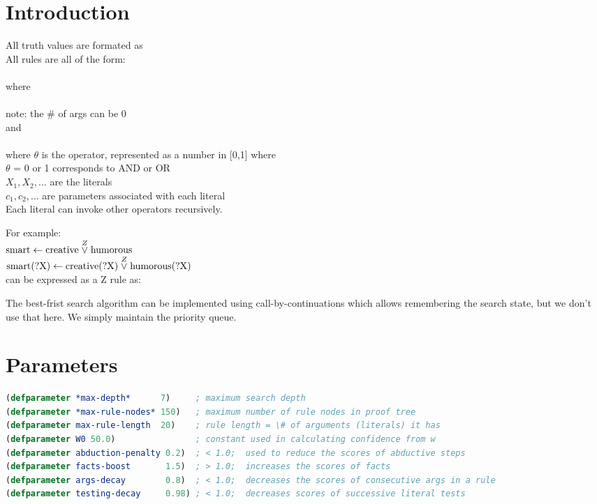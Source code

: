 \section{Introduction}

All truth values are formated as \\
All rules are all of the form:\\
\tab {}\\
where\\
\tab {} \\
note: the \# of args can be 0 \\
and\\
\tab {} \\
 where $\theta$ is the operator, represented as a number in [0,1] where \\
\tab $\theta$ = 0 or 1 corresponds to AND or OR \\ 
\tab $X_1, X_2, ...$ are the literals \\
\tab $c_1, c_2, ...$ are parameters associated with each literal \\
Each literal can invoke other operators recursively.

For example:\\
\tab $\mbox{smart} \leftarrow \mbox{creative} \stackrel{Z}{\vee} \mbox{humorous}$ \\
\tab $\mbox{smart(?X)} \leftarrow \mbox{creative(?X)} \stackrel{Z}{\vee} \mbox{humorous(?X)} $ \\
can be expressed as a Z rule as: \\
\tab {}

The best-frist search algorithm can be implemented using call-by-continuations which allows
remembering the search state, but we don't use that here.  We simply maintain the priority queue.

\section{Parameters}

\begin{lstlisting}[language=Lisp]
(defparameter *max-depth*      7)     ; maximum search depth
(defparameter *max-rule-nodes* 150)   ; maximum number of rule nodes in proof tree
(defparameter max-rule-length  20)    ; rule length = \# of arguments (literals) it has
(defparameter W0 50.0)                ; constant used in calculating confidence from w
(defparameter abduction-penalty 0.2)  ; < 1.0;  used to reduce the scores of abductive steps
(defparameter facts-boost       1.5)  ; > 1.0;  increases the scores of facts
(defparameter args-decay        0.8)  ; < 1.0;  decreases the scores of consecutive args in a rule
(defparameter testing-decay     0.98) ; < 1.0;  decreases scores of successive literal tests
\end{lstlisting}

